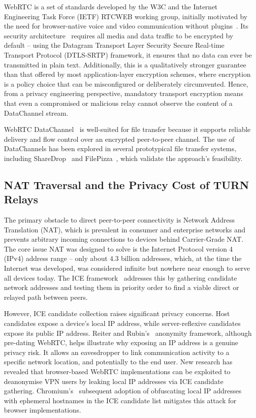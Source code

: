 \documentclass[12pt,a4paper,oneside]{report}
\begin{document}
WebRTC is a set of standards developed by the W3C and the Internet Engineering Task Force (IETF) RTCWEB working group, initially motivated by the need for browser-native voice and video communication without plugins~\cite{rfc8825}. Its security architecture~\cite{rfc8827} requires all media and data traffic to be encrypted by default -- using the Datagram Transport Layer Security Secure Real-time Transport Protocol (DTLS-SRTP) framework, it ensures that no data can ever be transmitted in plain text. Additionally, this is a qualitatively stronger guarantee than that offered by most application-layer encryption schemes, where encryption is a policy choice that can be misconfigured or deliberately circumvented. Hence, from a privacy engineering perspective, mandatory transport encryption means that even a compromised or malicious relay cannot observe the content of a DataChannel stream.

WebRTC DataChannel~\cite{rfc8831} is well-suited for file transfer because it supports reliable delivery and flow control over an encrypted peer-to-peer channel. The use of DataChannels has been explored in several prototypical file transfer systems, including ShareDrop~\cite{sharedrop} and FilePizza~\cite{filepizza}, which validate the approach's feasibility.


\subsection{NAT Traversal and the Privacy Cost of TURN Relays}
\label{sec:nat-traversal}

The primary obstacle to direct peer-to-peer connectivity is Network Address Translation (NAT), which is prevalent in consumer and enterprise networks and prevents arbitrary incoming connections to devices behind Carrier-Grade NAT. The core issue NAT was designed to solve is the Internet Protocol version 4 (IPv4) address range -- only about 4.3 billion addresses, which, at the time the Internet was developed, was considered infinite but nowhere near enough to serve all devices today. The ICE framework~\cite{rfc8445} addresses this by gathering candidate network addresses and testing them in priority order to find a viable direct or relayed path between peers.

However, ICE candidate collection raises significant privacy concerns. Host candidates expose a device's local IP address, while server-reflexive candidates expose its public IP address. Reiter and Rubin's~\cite{reiter1998} anonymity framework, although pre-dating WebRTC, helps illustrate why exposing an IP address is a genuine privacy risk. It allows an eavesdropper to link communication activity to a specific network location, and potentially to the end user. New research has revealed that browser-based WebRTC implementations can be exploited to deanonymise VPN users by leaking local IP addresses via ICE candidate gathering. Chromium's~\cite{chromium} subsequent adoption of obfuscating local IP addresses with ephemeral hostnames in the ICE candidate list mitigates this attack for browser implementations.
\end{document}
